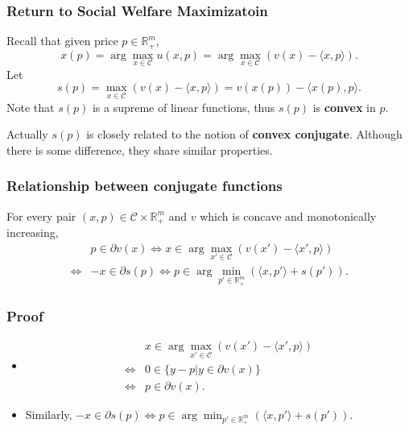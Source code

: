 \documentclass{beamer}
\begin{document}
\begin{frame}
    \frametitle{Return to Social Welfare Maximizatoin}
    Recall that given price $p\in \mathbb{R}_+^m$,
    \begin{equation}
        x(p)=\arg\max_{x\in \mathcal{C}}u(x,p)=\arg\max_{x\in \mathcal{C}}(v(x)-\langle x,p\rangle).
    \end{equation}
    Let
    \begin{equation}
        s(p)=\max_{x\in \mathcal{C}}(v(x)-\langle x,p\rangle)=v(x(p))-\langle x(p),p\rangle.
    \end{equation}
    Note that $s(p)$ is a supreme of linear functions, thus $s(p)$ is \textbf{convex} in $p$.

    Actually $s(p)$ is closely related to the notion of \textbf{convex conjugate}. Although there is some difference, they share similar properties.
\end{frame}

\begin{frame}
    \frametitle{Relationship between conjugate functions}

    For every pair $(x,p)\in \mathcal{C}\times\mathbb{R}_+^m$ and $v$ which is concave and monotonically increasing,
    \begin{equation}
        \begin{array}{cl}
             & p \in \partial v(x)\iff x \in \arg\max_{x'\in \mathcal{C}} ( v(x')-\langle x',p\rangle ) \\
            \iff & -x \in \partial s(p)\iff p \in \arg\min_{p'\in \mathbb{R}_+^m} ( \langle x,p'\rangle + s(p') ).
        \end{array}
    \end{equation}
\end{frame}

\begin{frame}
    \frametitle{Proof}
    \begin{itemize}
        \item \begin{equation}
            \begin{array}{cl}
                 & x \in \arg\max_{x'\in \mathcal{C}} ( v(x')-\langle x',p\rangle ) \\
                \iff & 0\in\{y-p|y\in\partial v(x)\} \\
                \iff & p\in\partial v(x).
            \end{array}
        \end{equation}
        \item Similarly, $-x \in \partial s(p)\iff p \in \arg\min_{p'\in \mathbb{R}_+^m} ( \langle x,p'\rangle + s(p') )$.
    \end{itemize}
\end{frame}
\end{document}
